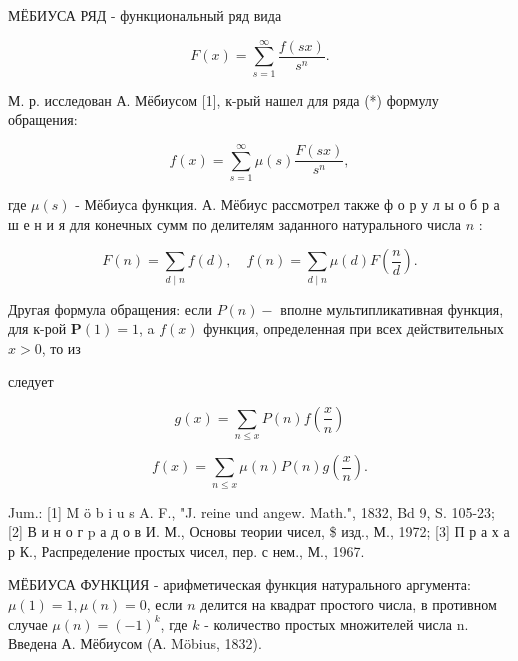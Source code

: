 \documentclass[10pt]{article}
\begin{document}
МЁБИУСА РЯД - функциональный ряд вида



\[

F(x)=\sum_{s=1}^{\infty} \frac{f(s x)}{s^{n}} .

\]



М. р. исследован А. Мёбиусом [1], к-рый нашел для ряда (*) формулу обращения:



\[

f(x)=\sum_{s=1}^{\infty} \mu(s) \frac{F(s x)}{s^{n}},

\]



где $\mu(s)$ - Мёбиуса функция. А. Мёбиус рассмотрел также ф о р у л ы о б р а ш е н и я для конечных сумм по делителям заданного натурального числа $n$ :



\[

F(n)=\sum_{d \mid n} f(d), \quad f(n)=\sum_{d \mid n} \mu(d) F\left(\frac{n}{d}\right) .

\]



Другая формула обращения: если $P(n)-$ вполне мультипликативная функция, для к-рой $\boldsymbol{P}(1)=1$, a $f(x)$ функция, определенная при всех действительных $x>0$, то из



следует



\[

g(x)=\sum_{n \leqslant x} P(n) f\left(\frac{x}{n}\right)

\]



\[

f(x)=\sum_{n \leqslant x} \mu(n) P(n) g\left(\frac{x}{n}\right) .

\]



Jum.: [1] M ö b i u s A. F., "J. reine und angew. Math.", 1832, Bd 9, S. 105-23; [2] В и н о г p а д о в И. М., Основы теории чисел, \$ изд., М., 1972; [3] П р а х а р К., Распределение простых чисел, пер. с нем., М., 1967.



МЁБИУСА ФУНКЦИЯ - арифметическая функция натурального аргумента: $\mu(1)=1, \mu(n)=0$, если $n$ делится на квадрат простого числа, в противном случае $\mu(n)=(-1)^{k}$, где $k$ - количество простых множителей числа n. Введена А. Мёбиусом (А. Möbius, 1832).
\end{document}
